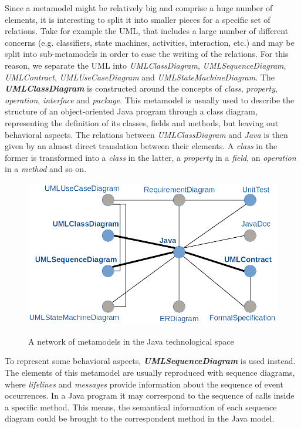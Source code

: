 \documentclass[tuberlin,cic,tc,english,noabntcite,oneside]{iiufrgs}
\begin{document}
Since a metamodel might be relatively big and comprise a huge number of elements, it is interesting to split it into smaller pieces for a specific set of relations. Take for example the UML, that includes a large number of different concerns (e.g. classifiers, state machines, activities, interaction, etc.) and may be split into sub-metamodels in order to ease the writing of the relations. For this reason, we separate the UML into \emph{UMLClassDiagram}, \emph{UMLSequenceDiagram}, \emph{UMLContract}, \emph{UMLUseCaseDiagram} and \emph{UMLStateMachineDiagram}. The \textbf{\emph{UMLClassDiagram}} is constructed around the concepts of \emph{class}, \emph{property}, \emph{operation}, \emph{interface} and \emph{package}. This metamodel is usually used to describe the structure of an object-oriented Java program through a class diagram, representing the definition of its classes, fields and methods, but leaving out behavioral aspects. The relations between \emph{UMLClassDiagram} and \emph{Java} is then given by an almost direct translation between their elements. A \emph{class} in the former is transformed into a \emph{class} in the latter, a \emph{property} in a \emph{field}, an \emph{operation} in a \emph{method} and so on.

\begin{figure}[H]
	\centering
    \caption{A network of metamodels in the Java technological space}
    \includegraphics[width=.7\textwidth]{network_metamodels}
    \label{fig:network_metamodels}
\end{figure}

To represent some behavioral aspects, \textbf{\emph{UMLSequenceDiagram}} is used instead. The elements of this metamodel are usually reproduced with sequence diagrams, where \emph{lifelines} and \emph{messages} provide information about the sequence of event occurrences. In a Java program it may correspond to the sequence of calls inside a specific method. This means, the semantical information of each sequence diagram could be brought to the correspondent method in the Java model.
\end{document}
